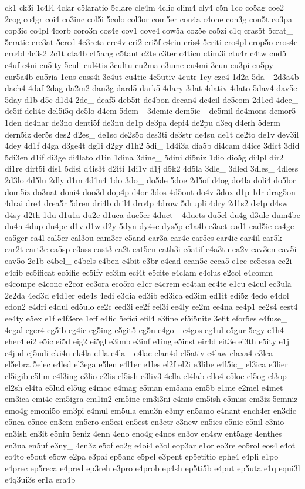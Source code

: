 {ck1 ck3i 1c4l4 4clar c5laratio 5clare cle4m 4clic clim4 cly4 c5n 1co co5ag coe2 2cog co4gr coi4 co3inc col5i 5colo col3or com5er con4a c4one con3g con5t co3pa cop3ic co4pl 4corb coro3n cos4e cov1 cove4 cow5a coz5e co5zi c1q cras5t 5crat\-\_\- 5cratic cre3at 5cred 4c3reta cre4v cri2 cri5f c4rin cris4 5criti cro4pl crop5o cros4e cru4d 4c3s2 2c1t cta4b ct5ang c5tant c2te c3ter c4ticu ctim3i ctu4r c4tw cud5 c4uf c4ui cu5ity 5culi cul4tis 3cultu cu2ma c3ume cu4mi 3cun cu3pi cu5py cur5a4b cu5ria 1cus cuss4i 3c4ut cu4tie 4c5utiv 4cutr 1cy cze4 1d2a 5da\-\_\- 2d3a4b dach4 4daf 2dag da2m2 dan3g dard5 dark5 4dary 3dat 4dativ 4dato 5dav4 dav5e 5day d1b d5c d1d4 2de\-\_\- deaf5 deb5it de4bon decan4 de4cil de5com 2d1ed 4dee\-\_\- de5if deli4e del5i5q de5lo d4em 5dem\-\_\- 3demic dem5ic\-\_\- de5mil de4mons demor5 1den de4nar de3no denti5f de3nu de1p de3pa depi4 de2pu d3eq d4erh 5derm dern5iz der5s des2 d2es\-\_\- de1sc de2s5o des3ti de3str de4su de1t de2to de1v dev3il 4dey 4d1f d4ga d3ge4t dg1i d2gy d1h2 5di\-\_\- 1d4i3a dia5b di4cam d4ice 3dict 3did 5di3en d1if di3ge di4lato d1in 1dina 3dine\-\_\- 5dini di5niz 1dio dio5g di4pl dir2 di1re dirt5i dis1 5disi d4is3t d2iti 1di1v d1j d5k2 4d5la 3dle\-\_\- 3dled 3dles\-\_\- 4dless 2d3lo 4d5lu 2dly d1m 4d1n4 1do 3do\-\_\- do5de 5doe 2d5of d4og do4la doli4 do5lor dom5iz do3nat doni4 doo3d dop4p d4or 3dos 4d5out do4v 3dox d1p 1dr drag5on 4drai dre4 drea5r 5dren dri4b dril4 dro4p 4drow 5drupli 4dry 2d1s2 ds4p d4sw d4sy d2th 1du d1u1a du2c d1uca duc5er 4duct\-\_\- 4ducts du5el du4g d3ule dum4be du4n 4dup du4pe d1v d1w d2y 5dyn dy4se dys5p e1a4b e3act ead1 ead5ie ea4ge ea5ger ea4l eal5er eal3ou eam3er e5and ear3a ear4c ear5es ear4ic ear4il ear5k ear2t eart3e ea5sp e3ass east3 ea2t eat5en eath3i e5atif e4a3tu ea2v eav3en eav5i eav5o 2e1b e4bel\-\_\- e4bels e4ben e4bit e3br e4cad ecan5c ecca5 e1ce ec5essa ec2i e4cib ec5ificat ec5ifie ec5ify ec3im eci4t e5cite e4clam e4clus e2col e4comm e4compe e4conc e2cor ec3ora eco5ro e1cr e4crem ec4tan ec4te e1cu e4cul ec3ula 2e2da 4ed3d e4d1er ede4s 4edi e3dia ed3ib ed3ica ed3im ed1it edi5z 4edo e4dol edon2 e4dri e4dul ed5ulo ee2c eed3i ee2f eel3i ee4ly ee2m ee4na ee4p1 ee2s4 eest4 ee4ty e5ex e1f e4f3ere 1eff e4fic 5efici efil4 e3fine ef5i5nite 3efit efor5es e4fuse\-\_\- 4egal eger4 eg5ib eg4ic eg5ing e5git5 eg5n e4go\-\_\- e4gos eg1ul e5gur 5egy e1h4 eher4 ei2 e5ic ei5d eig2 ei5gl e3imb e3inf e1ing e5inst eir4d eit3e ei3th e5ity e1j e4jud ej5udi eki4n ek4la e1la e4la\-\_\- e4lac elan4d el5ativ e4law elaxa4 e3lea el5ebra 5elec e4led el3ega e5len e4l1er e1les el2f el2i e3libe e4l5ic\-\_\- el3ica e3lier el5igib e5lim e4l3ing e3lio e2lis el5ish e3liv3 4ella el4lab ello4 e5loc el5og el3op\-\_\- el2sh el4ta e5lud el5ug e4mac e4mag e5man em5ana em5b e1me e2mel e4met em3ica emi4e em5igra em1in2 em5ine em3i3ni e4mis em5ish e5miss em3iz 5emniz emo4g emoni5o em3pi e4mul em5ula emu3n e3my en5amo e4nant ench4er en3dic e5nea e5nee en3em en5ero en5esi en5est en3etr e3new en5ics e5nie e5nil e3nio en3ish en3it e5niu 5eniz 4enn 4eno eno4g e4nos en3ov en4sw ent5age 4enthes en3ua en5uf e3ny\-\_\- 4en3z e5of eo2g e4oi4 e3ol eop3ar e1or eo3re eo5rol eos4 e4ot eo4to e5out e5ow e2pa e3pai ep5anc e5pel e3pent ep5etitio ephe4 e4pli e1po e4prec ep5reca e4pred ep3reh e3pro e4prob ep4sh ep5ti5b e4put ep5uta e1q equi3l e4q3ui3s er1a era4b }
